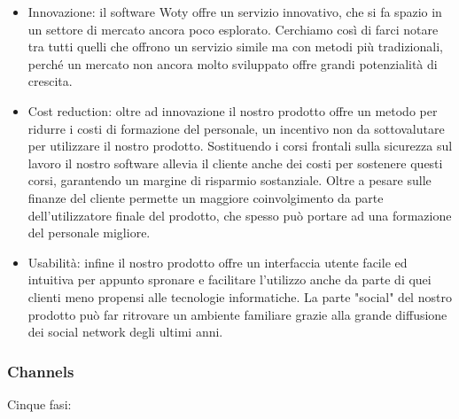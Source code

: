 \begin{itemize}
\item Innovazione: il software Woty offre un servizio innovativo, che si fa spazio in un settore di mercato ancora poco esplorato. Cerchiamo così di farci notare tra tutti quelli che offrono un servizio simile ma con metodi più tradizionali, perché un mercato non ancora molto sviluppato offre grandi potenzialità di crescita.
\item Cost reduction: oltre ad innovazione il nostro prodotto offre un metodo per ridurre i costi di formazione del personale, un incentivo non da sottovalutare per utilizzare il nostro prodotto. Sostituendo i corsi frontali sulla sicurezza sul lavoro il nostro software allevia il cliente anche dei costi per sostenere questi corsi, garantendo un margine di risparmio sostanziale. Oltre a pesare sulle finanze del cliente permette un maggiore coinvolgimento da parte dell'utilizzatore finale del prodotto, che spesso può portare ad una formazione del personale migliore.
\item Usabilità: infine il nostro prodotto offre un interfaccia utente facile ed intuitiva per appunto spronare e facilitare l'utilizzo anche da parte di quei clienti meno propensi alle tecnologie informatiche. La parte "social" del nostro prodotto può far ritrovare un ambiente familiare grazie alla grande diffusione dei social network degli ultimi anni.
\end{itemize}

\subsubsection{Channels}

Cinque fasi: 

